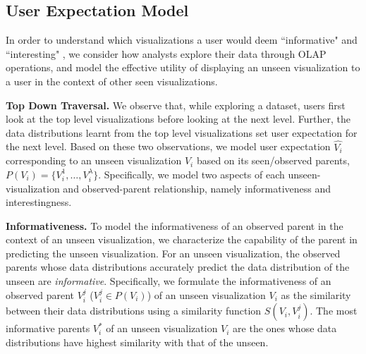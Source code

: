 \fi

\subsection{User Expectation Model}
In order to understand which visualizations a user would deem ``informative" and ``interesting" , we consider how analysts explore their data through OLAP operations, and model the effective utility of displaying an unseen visualization to a user in the context of other seen visualizations. 
 
\textbf{Top Down Traversal.} We observe that, while exploring a dataset, users first look at the top level visualizations before looking at the next level. Further, the data distributions learnt from the top level visualizations set user expectation for the next level. Based on these two observations, we model user expectation $\hat{V_i}$ corresponding to an unseen visualization $V_i$ based on its seen/observed parents, $P(V_i) = \{V_i^1, \ldots, V_i^\lambda\}$. Specifically, we model two aspects of each unseen-visualization and observed-parent relationship, namely informativeness and interestingness. 

\textbf{Informativeness.} To model the informativeness of an observed parent in the context of an unseen visualization, we characterize the capability of the parent in predicting the unseen visualization. For an unseen visualization, the observed parents whose data distributions accurately predict the data distribution of the unseen are \emph{informative}. Specifically, we formulate the informativeness of an observed parent $V_i^j$ ($V_i^j \in P(V_i)$) of an unseen visualization $V_i$ as the similarity between their data distributions using a similarity function $S(V_i, V_i^j)$. The most informative parents $V_i^*$ of an unseen visualization $V_i$ are the ones whose data distributions have highest similarity with that of the unseen.

